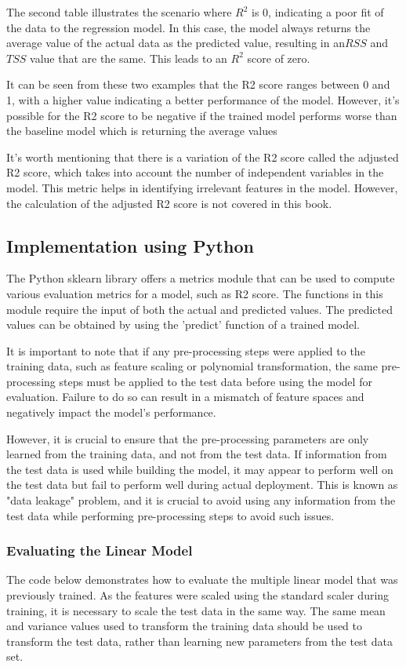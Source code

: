 {The second table illustrates the scenario where $R^2$  is 0, indicating a poor fit of the data to the regression model. In this case, the model always returns the average value of the actual data as the predicted value, resulting in an$RSS$ and $TSS$ value that are the same. This leads to an $R^2$ score of zero. 

It can be seen from these two examples that the R2 score ranges between 0 and 1, with a higher value indicating a better performance of the model. However, it's possible for the R2 score to be negative if the trained model performs worse than the baseline model which is returning the average values

It's worth mentioning that there is a variation of the R2 score called the adjusted R2 score, which takes into account the number of independent variables in the model. This metric helps in identifying irrelevant features in the model. However, the calculation of the adjusted R2 score is not covered in this book.

\newpage
\subsection{Implementation using Python}
The Python sklearn library offers a metrics module that can be used to compute various evaluation metrics for a model, such as R2 score. The functions in this module require the input of both the actual and predicted values. The predicted values can be obtained by using the 'predict' function of a trained model.

It is important to note that if any pre-processing steps were applied to the training data, such as feature scaling or polynomial transformation, the same pre-processing steps must be applied to the test data before using the model for evaluation. Failure to do so can result in a mismatch of feature spaces and negatively impact the model's performance.

However, it is crucial to ensure that the pre-processing parameters are only learned from the training data, and not from the test data. If information from the test data is used while building the model, it may appear to perform well on the test data but fail to perform well during actual deployment. This is known as "data leakage" problem, and it is crucial to avoid using any information from the test data while performing pre-processing steps to avoid such issues.

\subsubsection{\textbf{Evaluating the Linear Model}}
The code below demonstrates how to evaluate the multiple linear model that was previously trained. As the features were scaled using the standard scaler during training, it is necessary to scale the test data in the same way. The same mean and variance values used to transform the training data should be used to transform the test data, rather than learning new parameters from the test data set. 

}
